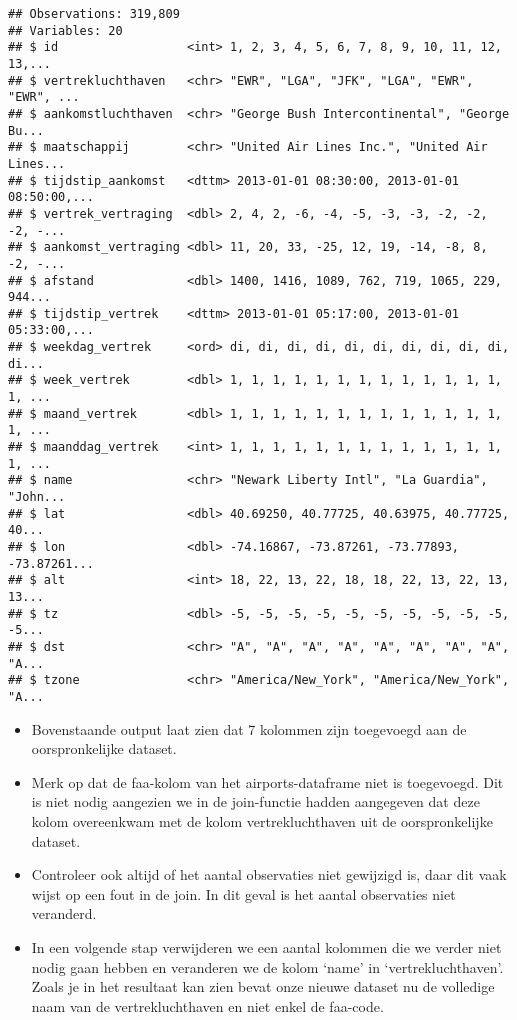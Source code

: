 \documentclass[]{memoir}
\providecommand{\tightlist}{%
  \setlength{\itemsep}{0pt}\setlength{\parskip}{0pt}}
\begin{document}
\begin{verbatim}
## Observations: 319,809
## Variables: 20
## $ id                  <int> 1, 2, 3, 4, 5, 6, 7, 8, 9, 10, 11, 12, 13,...
## $ vertrekluchthaven   <chr> "EWR", "LGA", "JFK", "LGA", "EWR", "EWR", ...
## $ aankomstluchthaven  <chr> "George Bush Intercontinental", "George Bu...
## $ maatschappij        <chr> "United Air Lines Inc.", "United Air Lines...
## $ tijdstip_aankomst   <dttm> 2013-01-01 08:30:00, 2013-01-01 08:50:00,...
## $ vertrek_vertraging  <dbl> 2, 4, 2, -6, -4, -5, -3, -3, -2, -2, -2, -...
## $ aankomst_vertraging <dbl> 11, 20, 33, -25, 12, 19, -14, -8, 8, -2, -...
## $ afstand             <dbl> 1400, 1416, 1089, 762, 719, 1065, 229, 944...
## $ tijdstip_vertrek    <dttm> 2013-01-01 05:17:00, 2013-01-01 05:33:00,...
## $ weekdag_vertrek     <ord> di, di, di, di, di, di, di, di, di, di, di...
## $ week_vertrek        <dbl> 1, 1, 1, 1, 1, 1, 1, 1, 1, 1, 1, 1, 1, 1, ...
## $ maand_vertrek       <dbl> 1, 1, 1, 1, 1, 1, 1, 1, 1, 1, 1, 1, 1, 1, ...
## $ maanddag_vertrek    <int> 1, 1, 1, 1, 1, 1, 1, 1, 1, 1, 1, 1, 1, 1, ...
## $ name                <chr> "Newark Liberty Intl", "La Guardia", "John...
## $ lat                 <dbl> 40.69250, 40.77725, 40.63975, 40.77725, 40...
## $ lon                 <dbl> -74.16867, -73.87261, -73.77893, -73.87261...
## $ alt                 <int> 18, 22, 13, 22, 18, 18, 22, 13, 22, 13, 13...
## $ tz                  <dbl> -5, -5, -5, -5, -5, -5, -5, -5, -5, -5, -5...
## $ dst                 <chr> "A", "A", "A", "A", "A", "A", "A", "A", "A...
## $ tzone               <chr> "America/New_York", "America/New_York", "A...
\end{verbatim}

\begin{itemize}
\tightlist
\item
  Bovenstaande output laat zien dat 7 kolommen zijn toegevoegd aan de
  oorspronkelijke dataset.
\item
  Merk op dat de faa-kolom van het airports-dataframe niet is
  toegevoegd. Dit is niet nodig aangezien we in de join-functie hadden
  aangegeven dat deze kolom overeenkwam met de kolom vertrekluchthaven
  uit de oorspronkelijke dataset.
\item
  Controleer ook altijd of het aantal observaties niet gewijzigd is,
  daar dit vaak wijst op een fout in de join. In dit geval is het aantal
  observaties niet veranderd.
\item
  In een volgende stap verwijderen we een aantal kolommen die we verder
  niet nodig gaan hebben en veranderen we de kolom `name' in
  `vertrekluchthaven'. Zoals je in het resultaat kan zien bevat onze
  nieuwe dataset nu de volledige naam van de vertrekluchthaven en niet
  enkel de faa-code.
\end{itemize}
\end{document}
